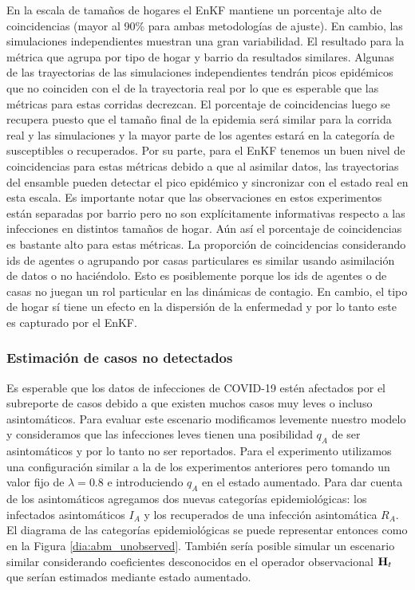 En la escala de tamaños de hogares el EnKF mantiene un porcentaje alto de coincidencias (mayor al 90\% para ambas metodologías de ajuste). En cambio, las simulaciones independientes muestran una gran variabilidad. El resultado para la métrica que agrupa por tipo de hogar y barrio da resultados similares. Algunas de las trayectorias de las simulaciones independientes tendrán picos epidémicos que no coinciden con el de la trayectoria real por lo que es esperable que las métricas para estas corridas decrezcan. El porcentaje de coincidencias luego se recupera puesto que el tamaño final de la epidemia será similar para la corrida real y las simulaciones y la mayor parte de los agentes estará en la categoría de susceptibles o recuperados. Por su parte, para el EnKF tenemos un buen nivel de coincidencias para estas métricas debido a que al asimilar datos, las trayectorias del ensamble pueden detectar el pico epidémico y sincronizar con el estado real en esta escala. Es importante notar que las observaciones en estos experimentos están separadas por barrio pero no son explícitamente informativas respecto a las infecciones en distintos tamaños de hogar. Aún así el porcentaje de coincidencias es bastante alto para estas métricas. La proporción de coincidencias considerando ids de agentes o agrupando por casas particulares es similar usando asimilación de datos o no haciéndolo. Esto es posiblemente porque los ids de agentes o de casas no juegan un rol particular en las dinámicas de contagio. En cambio, el tipo de hogar sí tiene un efecto en la dispersión de la enfermedad y por lo tanto este es capturado por el EnKF.

\subsubsection{Estimación de casos no detectados}

Es esperable que los datos de infecciones de COVID-19 estén afectados por el subreporte de casos debido a que existen muchos casos muy leves o incluso asintomáticos. Para evaluar este escenario modificamos levemente nuestro modelo y consideramos que las infecciones leves tienen una posibilidad $q_A$ de ser asintomáticos y por lo tanto no ser reportados. Para el experimento utilizamos una configuración similar a la de los experimentos anteriores pero tomando un valor fijo de $\lambda = 0.8$ e introduciendo $q_A$ en el estado aumentado. Para dar cuenta de los asintomáticos agregamos dos nuevas categorías epidemiológicas: los infectados asintomáticos $I_A$ y los recuperados de una infección asintomática $R_A$. El diagrama de las categorías epidemiológicas se puede representar entonces como en la Figura \ref{dia:abm_unobserved}. También sería posible simular un escenario similar considerando coeficientes desconocidos en el operador observacional $\mathbf{H}_t$ que serían estimados mediante estado aumentado.

